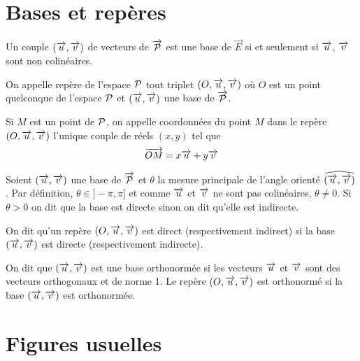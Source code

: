 \section{Bases et repères}

Un couple $(\vu,\vv)$ de vecteurs de $\vect{\P}$ est une base de $\vec{E}$ si et 
seulement si $\vu$, $\vv$ sont non colinéaires. 

\begin{defdef}
  On appelle repère de l'espace $\P$ tout triplet $(O,\vu,\vv)$ où $O$ est un 
  point quelconque de l'espace $\P$ et $(\vu,\vv)$ une base de $\vect{\P}$.

  Si $M$ est un point de $\P$, on appelle coordonnées du point $M$ dans le 
  repère $(O,\vu,\vv)$ l'unique couple de réels $(x,y)$ tel que
  \begin{equation}
    \vect{OM}=x\vu+y\vv
  \end{equation}
\end{defdef}

Soient $(\vu,\vv)$ une base de $\vect{\P}$ et $\theta$ la mesure principale de 
l'angle orienté $\widehat{(\vu,\vv)}$. Par définition, $\theta \in ]-\pi, \pi]$ 
et comme $\vu$ et $\vv$ ne sont pas colinéaires, $\theta \neq 0$. Si $\theta >0$ 
on dit que la base est directe sinon on dit qu'elle est indirecte.

\begin{defdef}
  On dit qu'un repère $(O,\vu,\vv)$ est direct (respectivement indirect) si la base 
  $(\vu,\vv)$ est directe (respectivement indirecte).
\end{defdef}

\begin{defdef}
  On dit que $(\vu,\vv)$ est une base orthonormée si les vecteurs $\vu$ et $\vv$ 
  sont des vecteurs orthogonaux et de norme 1. Le repère $(O,\vu,\vv)$ est 
  orthonormé si la base $(\vu,\vv)$ est orthonormée.
\end{defdef}

\section{Figures usuelles}

